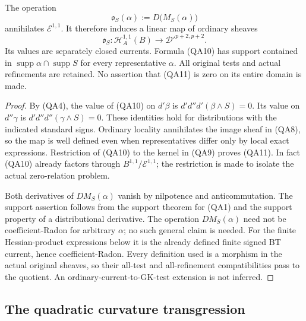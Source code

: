 \begin{proposition}
The operation
\[
        \mathfrak o_S(\alpha):=D\bigl(M_S(\alpha)\bigr)   \tag{QA10}
\]
annihilates $\mathcal E^{1,1}$.  It therefore induces a linear
map of ordinary sheaves
\[
 \mathfrak o_S:\mathcal H_A^{1,1}(B)
                  \longrightarrow\mathcal D'^{p+2,p+2}. \tag{QA11}
\]
Its values are separately closed currents.  Formula (QA10) has
support contained in $\operatorname{supp}\alpha\cap
\operatorname{supp}S$ for every representative $\alpha$.
All original tests and actual refinements are retained.
No assertion that (QA11) is zero on its entire domain is made.
\end{proposition}

\begin{proof}
By (QA4), the value of (QA10) on $d'\beta$ is
$d'd''d'(\beta\wedge S)=0$.  Its value on $d''\gamma$ is
$d'd''d''(\gamma\wedge S)=0$.  These identities hold for
distributions with the indicated standard signs.  Ordinary locality
annihilates the image sheaf in (QA8), so the map is well defined
even when representatives differ only by local exact expressions.
Restriction of (QA10) to the kernel in (QA9) proves (QA11).
In fact (QA10) already factors through $B^{1,1}/\mathcal E^{1,1}$;
the restriction is made to isolate the actual zero-relation problem.

Both derivatives of $D M_S(\alpha)$ vanish by nilpotence and
anticommutation.  The support assertion follows from the support
theorem for (QA1) and the support property of a distributional
derivative.  The operation $D M_S(\alpha)$ need not be
coefficient-Radon for arbitrary $\alpha$; no such general claim is
needed.  For the finite Hessian-product expressions below it is the
already defined finite signed BT current, hence coefficient-Radon.
Every definition used is a morphism in the actual original sheaves,
so their all-test and all-refinement compatibilities pass to the
quotient.  An ordinary-current-to-GK-test extension is not inferred.
\end{proof}

\subsection{The quadratic curvature transgression}

